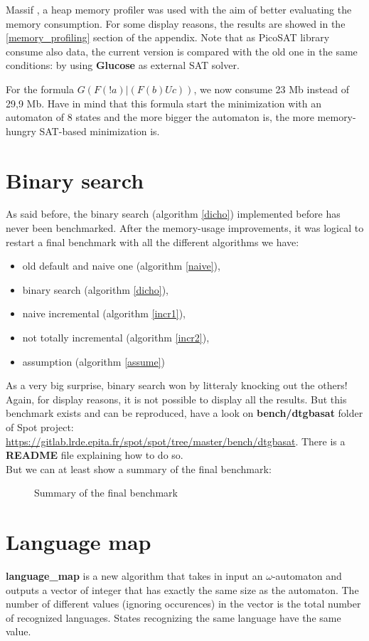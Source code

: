 Massif \cite{24}, a heap memory profiler was used with the aim of better evaluating the memory
consumption. For some display reasons, the results are showed in the \ref{memory_profiling}
section of the appendix. Note that as PicoSAT library consume also data, the current version is compared
with the old one in the same conditions: by using \textbf{Glucose} as external SAT solver.

For the formula $G(F(!a) | (F(b) U c))$, we now consume 23 Mb instead of 29,9 Mb. Have in mind that
this formula start the minimization with an automaton of 8 states and the more bigger the automaton is, the
more memory-hungry SAT-based minimization is.

\section{Binary search}
As said before, the binary search (algorithm \ref{dicho}) implemented before has never been benchmarked.
After the memory-usage improvements, it was logical to restart a final benchmark with all the different
algorithms we have:
\begin{itemize}
 \item old default and naive one (algorithm \ref{naive}),
 \item binary search (algorithm \ref{dicho}),
 \item naive incremental (algorithm \ref{incr1}),
 \item not totally incremental (algorithm \ref{incr2}),
 \item assumption (algorithm \ref{assume})
\end{itemize}

\noindent As a very big surprise, binary search won by litteraly knocking out the others! Again, for display
reasons, it is not possible to display all the results. But this benchmark exists and can be
reproduced, have a look on \textbf{bench/dtgbasat} folder of Spot project:
\url{https://gitlab.lrde.epita.fr/spot/spot/tree/master/bench/dtgbasat}. There is a \textbf{README} file
explaining how to do so.\\

But we can at least show a summary of the final benchmark:

\begin{figure}[H]
 \centering
 
 \caption{Summary of the final benchmark}
 \label{fig:final_bench_resume}
\end{figure}

\section{Language map}
\textbf{language\_map} is a new algorithm that takes in input an $\omega$-automaton and outputs a vector of 
integer that has exactly the same size as the automaton. The number of different values (ignoring
occurences) in the vector is the total number of recognized languages. States recognizing the same
language have the same value.\\

